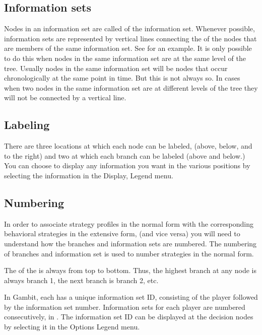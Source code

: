 \subsection{Information sets}
Nodes in an information set are called {\bf {}} of 
the information set.  Whenever possible, information sets are represented 
by vertical lines connecting
the  of the nodes that are members of the 
same information
set.  See  for an example.  
It is only possible to do this when nodes
in the same information set are at the same level of the tree.  Usually
nodes in the same information set will be nodes that occur chronologically
at the same point in time.  But this is not always so.  In cases when two
nodes in the same information set are at different levels of the tree they 
will not be connected by a vertical line.  

\subsection{Labeling}
There are three locations at which each node can be labeled, (above, 
below, and to the right) and two at which each branch can be 
 labeled (above and below.) You can choose to display
 any information you want in the various positions by selecting the 
information in the Display, Legend menu.  

\subsection{Numbering}\label{infosetnumbering}
In order  to associate strategy profiles in the
normal form with the corresponding behavioral strategies in the extensive
form, (and vice versa) you will need to understand how the branches and 
information sets are numbered.  The numbering of branches and information
 set is used to number strategies in the normal form.  

The  of the  is always
from top to bottom.  Thus, the highest branch at any node is always branch
1, the next branch is branch 2, etc. 

In Gambit, each  has a unique 
information set ID, consisting of the player followed by the information 
set number.  Information sets for each player are numbered consecutively, 
in .  
The information set ID can be displayed at the decision nodes by selecting 
it in the Options Legend menu.  


